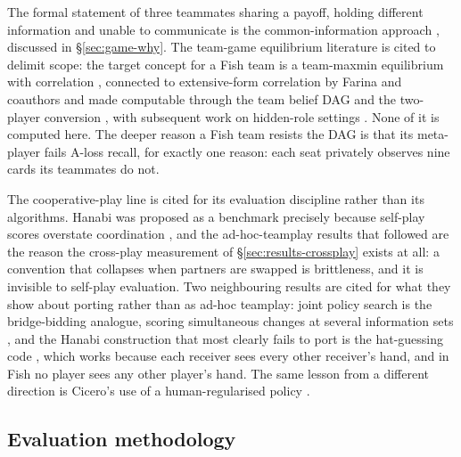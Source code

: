 The formal statement of three teammates sharing a payoff, holding different information and unable
to communicate is the common-information approach \cite{nayyar2013common}, discussed in
\S\ref{sec:game-why}. The team-game equilibrium literature is cited to delimit scope: the target
concept for a Fish team is a team-maxmin equilibrium with correlation \cite{celli-gatti}, connected
to extensive-form correlation by Farina and coauthors \cite{farina-collusion} and made computable
through the team belief DAG and the two-player conversion \cite{zhang-tbdag,carminati-tpi}, with
subsequent work on hidden-role settings \cite{carminati2024hiddenrole}. None of it is computed here.
The deeper reason a Fish team resists the DAG is that its meta-player fails A-loss recall, for
exactly one reason: each seat privately observes nine cards its teammates do not.

The cooperative-play line is cited for its evaluation discipline rather than its algorithms. Hanabi
was proposed as a benchmark precisely because self-play scores overstate coordination
\cite{bard-hanabi}, and the ad-hoc-teamplay results that followed
\cite{hu-sad,hu-otherplay,hu2021obl,hu2022sed,jacob2022pikl,hu2022humanregularized,dizdarevic2025ah2ac2}
are the reason the cross-play measurement of \S\ref{sec:results-crossplay} exists at all: a
convention that collapses when partners are swapped is brittleness, and it is invisible to self-play
evaluation. Two neighbouring results are cited for what they show about porting rather than as
ad-hoc teamplay: joint policy search is the bridge-bidding analogue, scoring simultaneous changes at
several information sets \cite{tian2020jps}, and the Hanabi construction that most clearly fails to
port is the hat-guessing code \cite{cox-hanabi}, which works because each receiver sees every other
receiver's hand, and in Fish no player sees any other player's hand. The same lesson from a different direction is Cicero's use of a human-regularised policy
\cite{fair2022cicero}.

\subsection{Evaluation methodology}
\label{sec:related-eval}

